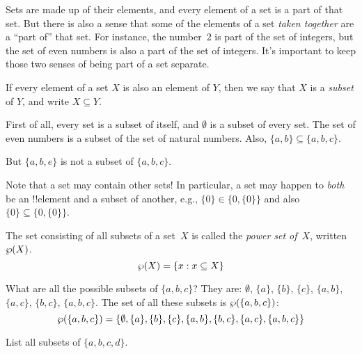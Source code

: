 \documentclass[../../include/open-logic-section]{subfiles}
\begin{document}

\begin{explain}
Sets are made up of their elements, and every element of a set is a
part of that set. But there is also a sense that some of the elements
of a set \emph{taken together} are a ``part of'' that set. For
instance, the number~$2$ is part of the set of integers, but the set
of even numbers is also a part of the set of integers. It's important
to keep those two senses of being part of a set separate.
\end{explain}

\begin{defn}
If every element of a set $X$ is also an element of
    $Y$, then we say that $X$ is a \emph{subset} of $Y$, and write $X
    \subseteq Y$.
\end{defn}

\begin{ex}
First of all, every set is a subset of itself, and $\emptyset$ is a
subset of every set. The set of even numbers is a subset of the set of
natural numbers. Also, $\{ a, b \} \subseteq \{ a, b, c \}$.

But $\{ a, b, e \}$ is not a subset of $\{ a, b, c \}$.
\end{ex}

\begin{explain}
Note that a set may contain other sets!{} In particular, a set may
happen to \emph{both} be an !!{element} and a subset of another, e.g.,
$\{0\} \in \{0, \{0\}\}$ and also $\{0\} \subseteq \{0, \{0\}\}$.
\end{explain}


\begin{defn}
The set consisting of all subsets of a set~$X$ is called the
\emph{power set of}~$X$, written $\wp(X)$.
    \[\wp(X) = \{ x : x \subseteq X \} \]
\end{defn}

\begin{ex}
What are all the possible subsets of $\{ a, b, c \}$? They are:
$\emptyset$, $\{a \}$, $\{b\}$, $\{c\}$, $\{a, b\}$, $\{a, c\}$, $\{b,
c\}$, $\{a, b, c\}$. The set of all these subsets is
$\wp(\{a,b,c\})$:
\[
\wp(\{ a, b, c \}) = \{\emptyset, \{a \}, \{b\}, \{c\}, \{a, b\},
\{b, c\}, \{a, c\}, \{a, b, c\}\}
\]
\end{ex}

\begin{prob}
List all subsets of $\{a, b, c, d\}$.
\end{prob}
\end{document}
